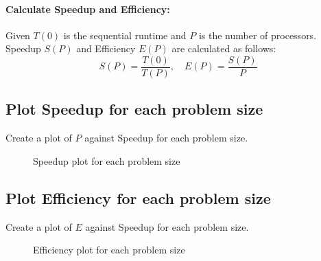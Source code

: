 \paragraph{Calculate Speedup and Efficiency:}
Given \(T(0)\) is the sequential runtime and \(P\) is the number of processors. Speedup $S(P)$ and Efficiency $E(P)$ are calculated as follows:
\[
    S(P) = \frac{T(0)}{T(P)}, \quad E(P) = \frac{S(P)}{P}
\]


\subsection*{Plot Speedup for each problem size}
Create a plot of $P$ against Speedup for each problem size. 

\begin{figure}
    \centering
    \caption{Speedup plot for each problem size}
    \label{fig:placeholder}
\end{figure}

\subsection*{Plot Efficiency for each problem size}
Create a plot of $E$ against Speedup for each problem size. 

\begin{figure}
    \centering
    \caption{Efficiency plot for each problem size}
    \label{fig:placeholder}
\end{figure}

